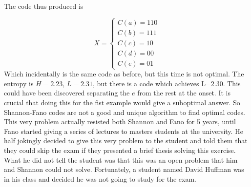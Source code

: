 \begin{figure}[h]
	\begin{center}
	\end{center}
\end{figure}

The code thus produced is

\begin{equation}
X = \begin{cases}
C(a) = 110\\
C(b) = 111 \\
C(c) = 10\\
C(d) = 00 \\
C(e) = 01
\end{cases}
\end{equation} 
Which incidentally is the same code as before, but this time is not optimal. The entropy is $H =2.23$, $L=2.31$, but there is a code which achieves L=$2.30$. This could have been discovered separating the $e$ from the rest at the onset. It is crucial that doing this for the fist example would give a suboptimal answer. So Shannon-Fano codes are not a good and unique algorithm to find optimal codes. This very problem actually resisted both Shannon and Fano for 5 years, until Fano started giving a series of lectures to masters students at the university. He half jokingly decided to give this very problem to the student and told them that they could skip the exam if they presented a brief thesis solving this exercise. What he did not tell the student was that this was an open problem that him and Shannon could not solve. Fortunately, a student named David Huffman was in his class and decided he was not going to study for the exam. 

